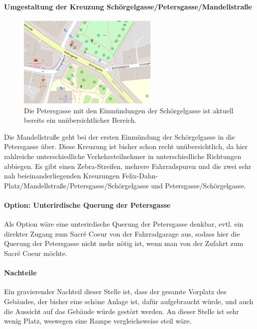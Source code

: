 \paragraph{Umgestaltung der Kreuzung Schörgelgasse/Petersgasse/Mandellstraße}
\begin{figure}
    \centering
    \includegraphics[width=0.6\textwidth]{main/bike/tunnel/uni/kreuzung1}
    \caption[Petersgasse/Mandellstraße mit Kreuzung Schörgelgasse]{Die Petersgasse mit den Einmündungen der Schörgelgasse ist aktuell bereits ein unübersichtlicher Bereich.}
\end{figure}

Die Mandellstraße geht bei der ersten Einmündung der Schörgelgasse in die Petersgasse über. Diese Kreuzung ist bisher schon recht unübersichtlich, da hier zahlreiche unterschiedliche Verkehrsteilnehmer in unterschiedliche Richtungen abbiegen. Es gibt einen Zebra-Streifen, mehrere Fahrradspuren und die zwei sehr nah beieinanderliegenden Kreuzungen Felix-Dahn-Platz/Mandellstraße/Petersgasse/Schörgelgasse und Petersgasse/Schörgelgasse.

\paragraph{Option: Unterirdische Querung der Petersgasse}
Als Option wäre eine unterirdische Querung der Petersgasse denkbar, evtl. ein direkter Zugang zum Sacré Coeur von der Fahrradgarage aus, sodass hier die Querung der Petersgasse nicht mehr nötig ist, wenn man von der Zufahrt zum Sacré Coeur möchte.

\paragraph{Nachteile}
Ein gravierender Nachteil dieser Stelle ist, dass der gesamte Vorplatz des Gebäudes, der bisher eine schöne Anlage ist, dafür aufgebraucht würde, und auch die Aussicht auf das Gebäude würde gestört werden. An dieser Stelle ist sehr wenig Platz, weswegen eine Rampe vergleichsweise steil wäre.

